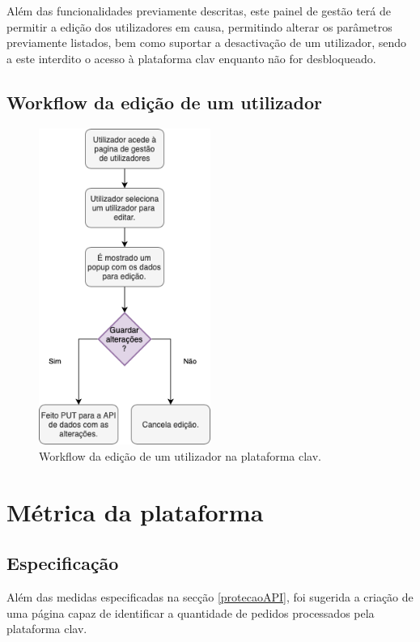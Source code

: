 Além das funcionalidades previamente descritas, este painel de gestão terá de permitir a edição dos utilizadores em causa, permitindo alterar os parâmetros previamente listados, bem como suportar a desactivação de um utilizador, sendo a este interdito o acesso à plataforma \gls{clav} enquanto não for desbloqueado.

\cleardoublepage
\subsection{Workflow da edição de um utilizador}

\begin{figure}[h!]
    \centering
    \includegraphics[width=0.5\textwidth]{img/diagramas/gestaometrica/Edicao.png}
    \caption{Workflow da edição de um utilizador na plataforma \gls{clav}.}
    \label{fig:flow_Edicao}
\end{figure}

\cleardoublepage
\section{Métrica da plataforma} \label{solucaoMetrica}
\vspace{-4mm}
\subsection{Especificação}
\vspace{-3mm}
Além das medidas especificadas na secção \ref{protecaoAPI}, foi sugerida a criação de uma página capaz de identificar a quantidade de pedidos processados pela plataforma \gls{clav}.

